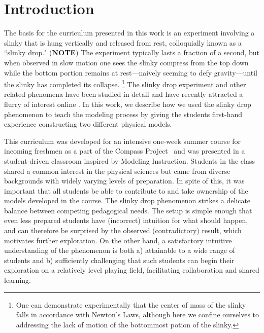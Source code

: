 \documentclass[prb,preprint,superscriptaddress]{revtex4-1}
\newcommand{\NOTEMARG}[1]{\marginpar{\raggedright\scriptsize\textbf{NOTE:} #1} (\textbf{NOTE})}
\begin{document}
\section{Introduction}
The basis for the curriculum presented in this work is an experiment involving a
slinky that is hung vertically and released from rest, colloquially known as a ``slinky drop."
 \NOTEMARG{Add multi-frame figure with labels. (Jesse)}
The experiment typically lasts a fraction of a second, but when observed in slow motion one sees the slinky compress from the top down while the bottom portion remains at rest---naively seeming to defy gravity---until the slinky has completed its collapse. 
\footnote{One can demonstrate experimentally that the center of mass of the slinky falls in accordance with Newton's Laws, although here we confine ourselves to addressing the lack of motion of the bottommost potion of the slinky.}
The slinky drop experiment and other related phenomena have
been studied in detail\cite{calkin1993, newburgh1995, graham2001, aguirregabiria2007,unruh2011, cross2012}
and have recently attracted a flurry of interest online \cite{..}.
In this work, we describe how we used the slinky drop phenomenon to teach the modeling process by giving
 the students first-hand experience constructing two different physical models.

This curriculum was developed for an intensive one-week summer course for
incoming freshmen as a part of the Compass Project~\cite{albana2013,Roth2012,drdf2013a,drdf2013b} and was
presented in a student-driven classroom inspired by Modeling Instruction\cite{hestenes1987}.
Students in the class shared a common interest in the physical sciences but came from diverse backgrounds with widely varying levels of preparation. In spite of this, it was important that all students be able to contribute to and take ownership of the models developed in the course. The slinky drop phenomenon strikes a delicate balance between competing pedagogical needs. The setup is simple enough that even less prepared students have (incorrect) intuition for what should happen, and can therefore be surprised by the observed (contradictory) result, which motivates further exploration. On the other hand, a satisfactory intuitive %
understanding of the phenomenon is both a) attainable to a wide range of students and b) sufficiently challenging that such students can begin their exploration on a relatively level playing field, facilitating collaboration and shared learning.
\end{document}
